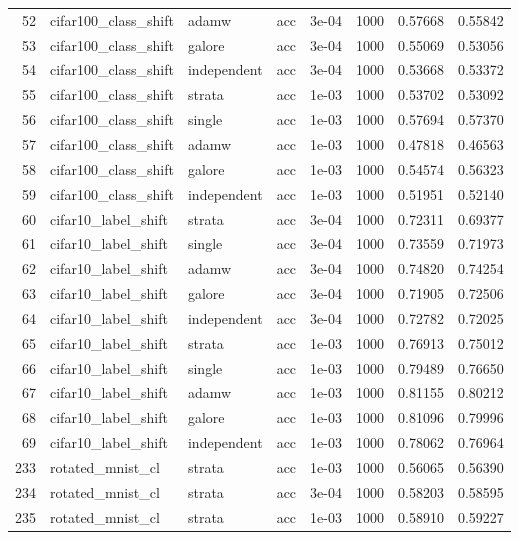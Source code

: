 \begin{longtable}{rlllrrrr}
52 & cifar100\_class\_shift & adamw & acc & 3e-04 & 1000 & 0.57668 & 0.55842 \\
53 & cifar100\_class\_shift & galore & acc & 3e-04 & 1000 & 0.55069 & 0.53056 \\
54 & cifar100\_class\_shift & independent & acc & 3e-04 & 1000 & 0.53668 & 0.53372 \\
\rowcolor{oursbg}
55 & cifar100\_class\_shift & strata & acc & 1e-03 & 1000 & 0.53702 & 0.53092 \\
56 & cifar100\_class\_shift & single & acc & 1e-03 & 1000 & 0.57694 & 0.57370 \\
57 & cifar100\_class\_shift & adamw & acc & 1e-03 & 1000 & 0.47818 & 0.46563 \\
58 & cifar100\_class\_shift & galore & acc & 1e-03 & 1000 & 0.54574 & 0.56323 \\
59 & cifar100\_class\_shift & independent & acc & 1e-03 & 1000 & 0.51951 & 0.52140 \\
\rowcolor{oursbg}
60 & cifar10\_label\_shift & strata & acc & 3e-04 & 1000 & 0.72311 & 0.69377 \\
61 & cifar10\_label\_shift & single & acc & 3e-04 & 1000 & 0.73559 & 0.71973 \\
62 & cifar10\_label\_shift & adamw & acc & 3e-04 & 1000 & 0.74820 & 0.74254 \\
63 & cifar10\_label\_shift & galore & acc & 3e-04 & 1000 & 0.71905 & 0.72506 \\
64 & cifar10\_label\_shift & independent & acc & 3e-04 & 1000 & 0.72782 & 0.72025 \\
\rowcolor{oursbg}
65 & cifar10\_label\_shift & strata & acc & 1e-03 & 1000 & 0.76913 & 0.75012 \\
66 & cifar10\_label\_shift & single & acc & 1e-03 & 1000 & 0.79489 & 0.76650 \\
67 & cifar10\_label\_shift & adamw & acc & 1e-03 & 1000 & 0.81155 & 0.80212 \\
68 & cifar10\_label\_shift & galore & acc & 1e-03 & 1000 & 0.81096 & 0.79996 \\
69 & cifar10\_label\_shift & independent & acc & 1e-03 & 1000 & 0.78062 & 0.76964 \\
\rowcolor{oursbg}
233 & rotated\_mnist\_cl & strata & acc & 1e-03 & 1000 & 0.56065 & 0.56390 \\
234 & rotated\_mnist\_cl & strata & acc & 3e-04 & 1000 & 0.58203 & 0.58595 \\
\rowcolor{oursbg}
235 & rotated\_mnist\_cl & strata & acc & 1e-03 & 1000 & 0.58910 & 0.59227 \\

\end{longtable}
